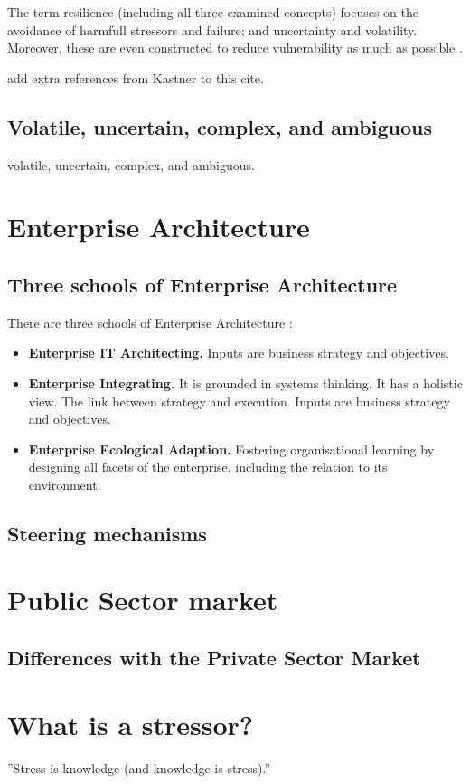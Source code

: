 The term resilience (including all three examined concepts) focuses on the avoidance of harmfull stressors and failure; and uncertainty and volatility. Moreover, these are even constructed to reduce vulnerability as much as possible \parencite{MartinBreen2011}.
\begin{remark}
add extra references from Kastner to this cite.
\end{remark}

\subsection{Volatile, uncertain, complex, and ambiguous}
\label{seb:tbvuca}

\Gls{volatile}, \gls{uncertain}, \gls{complex}, and \gls{ambiguous}.

\section{Enterprise Architecture}
\label{sec:tbea}

\subsection{Three schools of Enterprise Architecture}

There are three schools of Enterprise Architecture \parencite{Lapalme2012}:
\begin{itemize}
	\item{\textbf{Enterprise IT Architecting.} Inputs are business strategy and objectives.}
	\item{\textbf{Enterprise Integrating.} It is grounded in systems thinking. It has a holistic view. The link between strategy and execution. Inputs are business strategy and objectives.}
	\item{\textbf{Enterprise Ecological Adaption.} Fostering organisational learning by designing all facets of the enterprise, including the relation to its environment.}
\end{itemize}

\subsection{Steering mechanisms}
\label{sub:tbeasteering}

\section{Public Sector market}
\label{sec:tbpsmarket}

\subsection{Differences with the Private Sector Market}
\label{sub:tbdifferenceprivatesector}

\section{What is a stressor?}
\label{sec:stressor}

''Stress is knowledge (and knowledge is stress).'' \parencite[p. 54]{Taleb2013}

